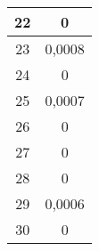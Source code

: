 \begin{table}[ht!]
\begin{tabular}{|c|c|}
		22      & 0                                      \\ \hline
		23      & 0,0008                                 \\ \hline
		24      & 0                                      \\ \hline
		25      & 0,0007                                 \\ \hline
		26      & 0                                      \\ \hline
		27      & 0                                      \\ \hline
		28      & 0                                      \\ \hline
		29      & 0,0006                                 \\ \hline
		30      & 0                                      \\ \hline
	\end{tabular}
\end{table}
\FloatBarrier

